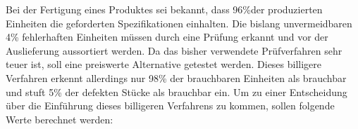 \documentclass{abgabe}
\begin{document}
\begin{questions}
    \question
    Bei der Fertigung eines Produktes sei bekannt, dass 96\%der produzierten Einheiten die geforderten Spezifikationen einhalten. 
    Die bislang unvermeidbaren 4\% fehlerhaften Einheiten müssen durch eine Prüfung erkannt und vor der Auslieferung aussortiert werden.
    Da das bisher verwendete Prüfverfahren sehr teuer ist, soll eine preiswerte Alternative getestet werden. 
    Dieses billigere Verfahren erkennt allerdings nur 98\% der brauchbaren Einheiten als brauchbar und stuft 5\% der defekten Stücke als brauchbar ein. 
    Um zu einer Entscheidung über die Einführung dieses billigeren Verfahrens zu kommen, sollen folgende Werte berechnet werden:
\end{questions}
\end{document}
